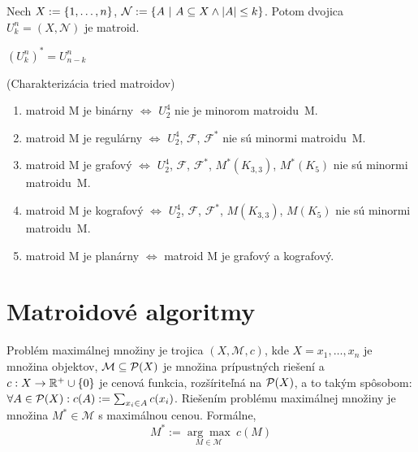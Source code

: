 \begin{definition}
Nech $X:=\left\{1, \ldots, n\right\}$, $\mathcal{N}:=\left\{A ~|~ A \subseteq X \wedge \left|A\right| \leq k\right\}$. Potom 
dvojica $U_k^n = (X, \mathcal{N})$ je matroid.
\end{definition}

\begin{theorem}
\label{th:m_unk}
$(U_k^n)^* = U_{n-k}^n$
\end{theorem}

\begin{theorem_hard}{(Charakterizácia tried matroidov)}
\begin{enumerate}
    \item matroid M je binárny $\Longleftrightarrow$ $U_2^4$ nie je minorom matroidu~M.
    \item matroid M je regulárny $\Longleftrightarrow$ $U_2^4$, $\mathcal{F}$, $\mathcal{F}^*$ nie sú minormi matroidu~M.
    \item matroid M je grafový $\Longleftrightarrow$ $U_2^4$, $\mathcal{F}$, $\mathcal{F}^*$, $M^*(K_{3,3})$, $M^*(K_{5})$ nie sú minormi matroidu~M.
    \item matroid M je kografový $\Longleftrightarrow$ $U_2^4$, $\mathcal{F}$, $\mathcal{F}^*$, $M(K_{3,3})$, $M(K_{5})$ nie sú minormi matroidu~M.
    \item matroid M je planárny $\Longleftrightarrow$ matroid M je grafový a kografový.
\end{enumerate}
\end{theorem_hard}


\section{Matroidové algoritmy}

\begin{definition}

Problém maximálnej množiny je trojica $(X, \mathcal{M}, c)$, kde 
$X = {x_1, \ldots, x_n}$ je množina objektov, 
$\mathcal{M} \subseteq \mathcal{P}(X)$ je množina prípustných riešení a $c: X \to \mathbb{R}^+ \cup \left\{0\right\}$
je cenová funkcia, rozšíriteľná na $\mathcal{P}(X)$, a to takým spôsobom: $\forall A \in \mathcal{P}(X): c(A) := \sum_{x_i \in A} c(x_i) $.
Riešením problému maximálnej množiny je množina $M^* \in \mathcal{M}$ s maximálnou cenou. Formálne,
$$M^* := \underset{M \in \mathcal{M}}{\arg\max}~c(M)$$

\end{definition}

